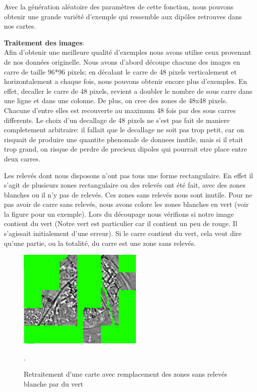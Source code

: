 \documentclass[a4paper, 12pt, titlepage, oneside, french]{article}
\begin{document}
	Avec la génération aléatoire des paramètres de cette fonction, nous pouvons obtenir une grande variété d'exemple qui ressemble aux dipôles retrouves dans nos cartes.

	\textbf{Traitement des images}:\\%
	\indent Afin d'obtenir une meilleure qualité d'exemples nous avons utilise ceux provenant de nos données originelle. Nous avons d'abord découpe chacune des images en carre de taille 96*96 pixels; en décalant le carre de 48 pixels verticalement et horizontalement a chaque fois, nous pouvons obtenir encore plus d'exemples. En effet, decaller le carre de 48 pixels, revient a doubler le nombre de sous carre dans une ligne et dans une colonne. De plus, on cree des zones de 48x48 pixels. Chacune d'entre elles est recouverte au maximum 48 fois par des sous carres differents. 
	Le choix d'un decallage de 48 pixels ne s'est pas fait de maniere completement arbitraire: il fallait que le decallage ne soit pas trop petit, car on risquait de produire une quantite phenomale de donnees inutile, mais si il etait trop grand, on risque de perdre de precieux dipoles qui pourrait etre place entre deux carres. 

Les relevés dont nous disposons n'ont pas tous une forme rectangulaire. En effet il s'agit de plusieurs zones rectangulaire ou des relevés ont été fait, avec des zones blanches ou il n'y pas de relevés. Ces zones sans relevés nous sont inutile. Pour ne pas avoir de carre sans relevés, nous avons colore les zones blanches en vert (voir la figure \cite{fig:ReleveColore} pour un exemple). Lors du découpage nous vérifions si notre image contient du vert (Notre vert est particulier car il contient un peu de rouge. Il s'agissait initialement d'une erreur). Si le carre contient du vert, cela veut dire qu'une partie, ou la totalité, du carre est une zone sans relevés.

\begin{figure}[H]
	\centering
		\includegraphics[width=6cm]{ExemplePretraitement.jpg}
		\caption{Retraitement d'une carte avec remplacement des zones sans relevés blanche par du vert}. 
		\label{fig:ReleveColore}
\end{figure}
\end{document}
